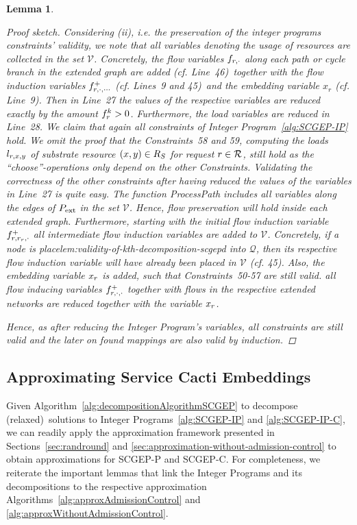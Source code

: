 \documentclass[10pt, conference, letterpaper]{IEEEtran}
\newtheorem{lemma}[theorem]{Lemma}
\begin{document}
\begin{lemma}
\begin{proof}[Proof sketch]
Considering (ii), i.e. the preservation of the integer programs constraints' validity, we note that all variables denoting the usage of resources are collected in the set $\mathcal{V}$. Concretely, the flow variables $f_{r,\cdot}$ along each path or cycle branch in the extended graph are added (cf. Line~46)~together with the flow induction variables $f^+_{r,\cdot,\cdots}$ (cf. Lines~9 and 45)~and the embedding variable $x_r$ (cf. Line~9). Then in  Line~27 the values of the respective variables are reduced exactly by the amount $\prob > 0$. Furthermore, the load variables are reduced in Line~28. We claim that again all constraints of Integer Program~\ref{alg:SCGEP-IP} hold. We omit the proof that the Constraints~58 and 59, computing the loads $l_{r,x,y}$ of substrate resource $(x,y) \in  R_{S}$ for request $r \in \mathcal{R}$, still hold as the ``choose''-operations only depend on the other Constraints. Validating the correctness of the other constraints after having reduced the values of the variables in Line~27 is quite easy. The function \emph{ProcessPath} includes all variables along the edges of $P_{\textnormal{ext}}$ in the set $\mathcal{V}$. Hence, flow preservation will hold inside each extended graph. Furthermore, starting with the initial flow induction variable $f^+_{\req,\VVroot,\cdot}$ all intermediate flow induction variables are added to $\mathcal{V}$. Concretely, if a node is placelem:validity-of-kth-decomposition-scgepd into $\mathcal{Q}$, then its respective flow induction variable will have already been placed in $\mathcal{V}$ (cf. 45). Also, the embedding variable $x_{r}$ is added, such that Constraints~50-57 are still valid.
all flow inducing variables $f^+_{r,\cdot,\cdot}$ together with flows in the respective extended networks are reduced together with the variable $x_r$. 

Hence, as after reducing the Integer Program's variables, all constraints are still valid and the later on found mappings are also valid by induction.
\end{proof}
\end{lemma}




\subsection{Approximating Service Cacti Embeddings}
\label{sec:cactus:approximation-service-cacti-embeddings}
Given Algorithm~\ref{alg:decompositionAlgorithmSCGEP} to decompose (relaxed)~solutions to Integer Programs~\ref{alg:SCGEP-IP} and \ref{alg:SCGEP-IP-C}, we can readily apply the approximation framework presented in Sections~\ref{sec:randround} and \ref{sec:approximation-without-admission-control} to obtain approximations for SCGEP-P and SCGEP-C. For completeness, we reiterate the important lemmas that link the Integer Programs and its decompositions to the respective approximation Algorithms~\ref{alg:approxAdmissionControl} and \ref{alg:approxWithoutAdmissionControl}. 
\end{document}
